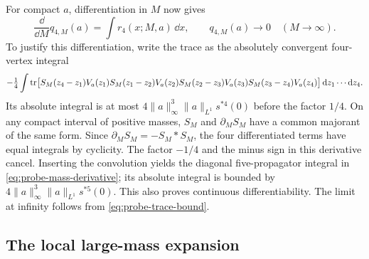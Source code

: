 For compact $a$, differentiation in $M$ now gives
\begin{equation}\label{eq:probe-mass-derivative}
 \frac{\dd}{\dd M}q_{4,M}(a)=\int r_4(x;M,a)\,\dd x,
 \qquad q_{4,M}(a)\longrightarrow0\quad(M\longrightarrow\infty).
\end{equation}
To justify this differentiation, write the trace as the absolutely convergent
four-vertex integral
\[
 -\tfrac14\int\operatorname{tr}\bigl[S_M(z_4-z_1)V_a(z_1)
 S_M(z_1-z_2)V_a(z_2)S_M(z_2-z_3)V_a(z_3)
 S_M(z_3-z_4)V_a(z_4)\bigr]\,\mathrm d z_1\cdots\mathrm d z_4.
\]
Its absolute integral is at most
$4\|a\|_\infty^3\|a\|_{L^1}s^{*4}(0)$ before the factor $1/4$.
On any compact interval of positive masses, $S_M$ and
$\partial_MS_M$ have a common majorant of the same form. Since
$\partial_MS_M=-S_M*S_M$, the four differentiated terms have equal
integrals by cyclicity. The factor $-1/4$ and the minus sign in this
derivative cancel. Inserting the convolution yields the diagonal
five-propagator integral in \eqref{eq:probe-mass-derivative}; its absolute
integral is bounded by $4\|a\|_\infty^3\|a\|_{L^1}s^{*5}(0)$.
This also proves continuous differentiability. The limit at infinity
follows from \eqref{eq:probe-trace-bound}.

\subsection{The local large-mass expansion}

